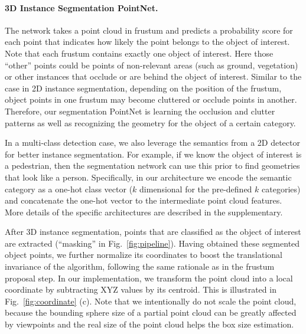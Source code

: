 \paragraph{3D Instance Segmentation PointNet.} The network takes a point cloud in frustum and predicts a probability score for each point that indicates how likely the point belongs to the object of interest. Note that each frustum contains exactly one object of interest. Here those ``other'' points could be points of non-relevant areas (such as ground, vegetation) or other instances that occlude or are behind the object of interest. Similar to the case in 2D instance segmentation, depending on the position of the frustum, object points in one frustum may become cluttered or occlude points in another. Therefore, our segmentation PointNet is learning the occlusion and clutter patterns as well as recognizing the geometry for the object of a certain category.


In a multi-class detection case, we also leverage the semantics from a 2D detector for better instance segmentation. For example, if we know the object of interest is a pedestrian, then the segmentation network can use this prior to find geometries that look like a person. Specifically, in our architecture we encode the semantic category as a one-hot class vector ($k$ dimensional for the pre-defined $k$ categories) and concatenate the one-hot vector to the intermediate point cloud features. More details of the specific architectures are described in the supplementary.

After 3D instance segmentation, points that are classified as the object of interest are extracted (``masking'' in Fig.~\ref{fig:pipeline}). Having obtained these segmented object points, we further normalize its coordinates to boost the translational invariance of the algorithm, following the same rationale as in the frustum proposal step.  In our implementation, we transform the point cloud into a local coordinate by subtracting XYZ values by its centroid. This is illustrated in Fig.~\ref{fig:coordinate} (c). Note that we intentionally do not scale the point cloud, because the bounding sphere size of a partial point cloud can be greatly affected by viewpoints and the real size of the point cloud helps the box size estimation.

